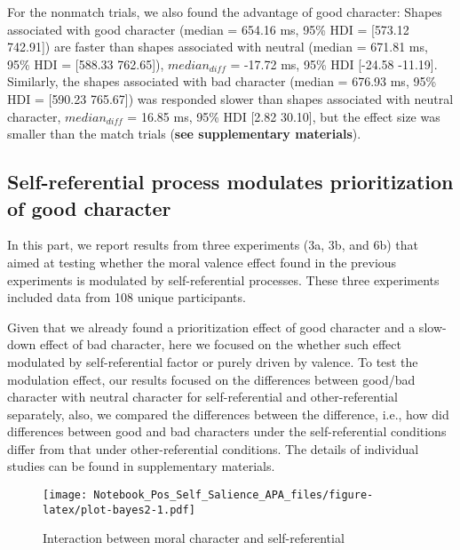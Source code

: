 \documentclass[
  man]{apa6}
\begin{document}
For the nonmatch trials, we also found the advantage of good character: Shapes associated with good character (median = 654.16 ms, 95\% HDI = {[}573.12 742.91{]}) are faster than shapes associated with neutral (median = 671.81 ms, 95\% HDI = {[}588.33 762.65{]}), \(median_{diff}\) = -17.72 ms, 95\% HDI {[}-24.58 -11.19{]}. Similarly, the shapes associated with bad character (median = 676.93 ms, 95\% HDI = {[}590.23 765.67{]}) was responded slower than shapes associated with neutral character, \(median_{diff}\) = 16.85 ms, 95\% HDI {[}2.82 30.10{]}, but the effect size was smaller than the match trials (\textbf{see supplementary materials}).

\hypertarget{self-referential-process-modulates-prioritization-of-good-character}{%
\subsection{Self-referential process modulates prioritization of good character}\label{self-referential-process-modulates-prioritization-of-good-character}}

In this part, we report results from three experiments (3a, 3b, and 6b) that aimed at testing whether the moral valence effect found in the previous experiments is modulated by self-referential processes. These three experiments included data from 108 unique participants.

Given that we already found a prioritization effect of good character and a slow-down effect of bad character, here we focused on the whether such effect modulated by self-referential factor or purely driven by valence. To test the modulation effect, our results focused on the differences between good/bad character with neutral character for self-referential and other-referential separately, also, we compared the differences between the difference, i.e., how did differences between good and bad characters under the self-referential conditions differ from that under other-referential conditions. The details of individual studies can be found in supplementary materials.

\begin{figure}
\centering
\texttt{[image: Notebook\_Pos\_Self\_Salience\_APA\_files/figure-latex/plot-bayes2-1.pdf]}
\caption{\label{fig:plot-bayes2}Interaction between moral character and self-referential}
\end{figure}
\end{document}
